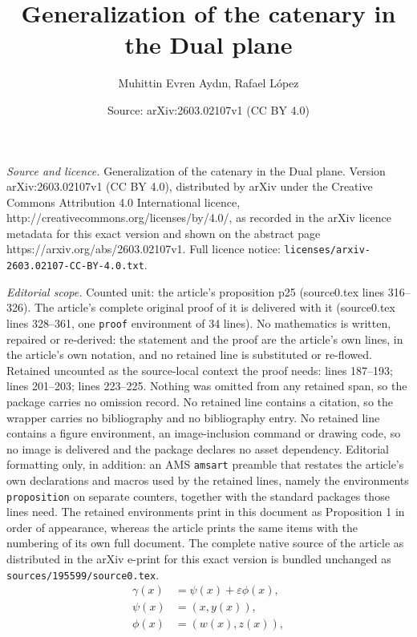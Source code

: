 \documentclass[10pt,a4paper]{amsart}
\title{Generalization of the catenary in the Dual plane}
\author{Muhittin Evren Aydın, Rafael L\'opez}
\date{Source: arXiv:2603.02107v1 (CC BY 4.0)}
\begin{document}
\maketitle

\noindent\emph{Source and licence.} Generalization of the catenary in the Dual plane. Version arXiv:2603.02107v1 (CC BY 4.0), distributed by arXiv under the Creative Commons Attribution 4.0 International licence, http://creativecommons.org/licenses/by/4.0/, as recorded in the arXiv licence metadata for this exact version and shown on the abstract page https://arxiv.org/abs/2603.02107v1. Full licence notice: \texttt{licenses/arxiv-2603.02107-CC-BY-4.0.txt}.\par\smallskip

\noindent\textit{Editorial scope.} Counted unit: the article's proposition p25 (source0.tex lines 316--326). The article's complete original proof of it is delivered with it (source0.tex lines 328--361, one \texttt{proof} environment of 34 lines). No mathematics is written, repaired or re-derived: the statement and the proof are the article's own lines, in the article's own notation, and no retained line is substituted or re-flowed.  Retained uncounted as the source-local context the proof needs: lines 187--193; lines 201--203; lines 223--225.  Nothing was omitted from any retained span, so the package carries no omission record.  No retained line contains a citation, so the wrapper carries no bibliography and no bibliography entry.  No retained line contains a figure environment, an image-inclusion command or drawing code, so no image is delivered and the package declares no asset dependency.  Editorial formatting only, in addition: an AMS \texttt{amsart} preamble that restates the article's own declarations and macros used by the retained lines, namely the environments \texttt{proposition} on separate counters, together with the standard packages those lines need.  The retained environments print in this document as Proposition 1 in order of appearance, whereas the article prints the same items with the numbering of its own full document.  The complete native source of the article as distributed in the arXiv e-print for this exact version is bundled unchanged as \texttt{sources/195599/source0.tex}.
\begin{equation}\label{g}
\begin{split}
\gamma(x)&=\psi(x)+\varepsilon \phi(x),\\
\psi(x)&=(x,y(x)),\\
\phi(x)&=(w(x),z(x)),
\end{split}
\end{equation}
\end{document}
